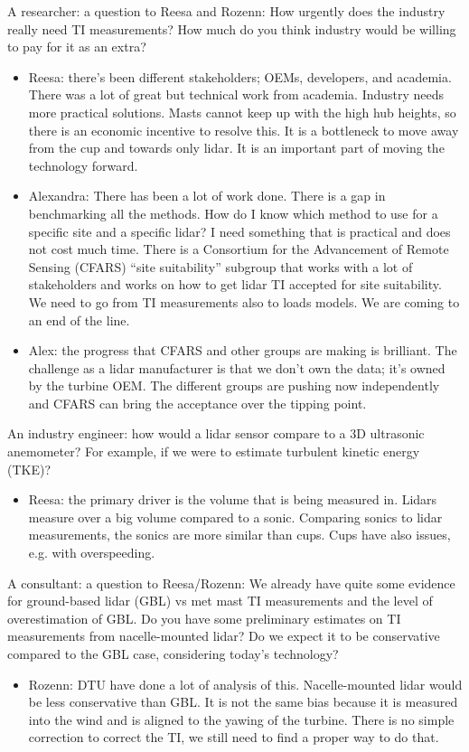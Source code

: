 A researcher: a question to Reesa and Rozenn: How urgently does the industry really need TI measurements? How much do you think industry would be willing to pay for it as an extra?
\begin{itemize}
    \item Reesa: there’s been different stakeholders; OEMs, developers, and academia. There was a lot of great but technical work from academia. Industry needs more practical solutions. Masts cannot keep up with the high hub heights, so there is an economic incentive to resolve this. It is a bottleneck to move away from the cup and towards only lidar. It is an important part of moving the technology forward. 
    \item Alexandra: There has been a lot of work done. There is a gap in benchmarking all the methods. How do I know which method to use for a specific site and a specific lidar? I need something that is practical and does not cost much time. There is a Consortium for the Advancement of Remote Sensing (CFARS) \enquote{site suitability} subgroup that works with a lot of stakeholders and works on how to get lidar TI accepted for site suitability. We need to go from TI measurements also to loads models. We are coming to an end of the line. 
    \item Alex: the progress that CFARS and other groups are making is brilliant. The challenge as a lidar manufacturer is that we don't own the data; it's owned by the turbine OEM. The different groups are pushing now independently and CFARS can bring the acceptance over the tipping point. 
\end{itemize}

An industry engineer: how would a lidar sensor compare to a 3D ultrasonic anemometer? For example, if we were to estimate turbulent kinetic energy (TKE)?
\begin{itemize}
    \item Reesa: the primary driver is the volume that is being measured in. Lidars measure over a big volume compared to a sonic. Comparing sonics to lidar measurements, the sonics are more similar than cups. Cups have also issues, e.g. with overspeeding. 
\end{itemize}

A consultant: a question to Reesa/Rozenn: We already have quite some evidence for ground-based lidar (GBL) vs met mast TI measurements and the level of overestimation of GBL. Do you have some preliminary estimates on TI measurements from nacelle-mounted lidar? Do we expect it to be conservative compared to the GBL case, considering today's technology?
\begin{itemize}
    \item Rozenn: DTU have done a lot of analysis of this. Nacelle-mounted lidar would be less conservative than GBL. It is not the same bias because it is measured into the wind and is aligned to the yawing of the turbine. There is no simple correction to correct the TI, we still need to find a proper way to do that.
\end{itemize}

